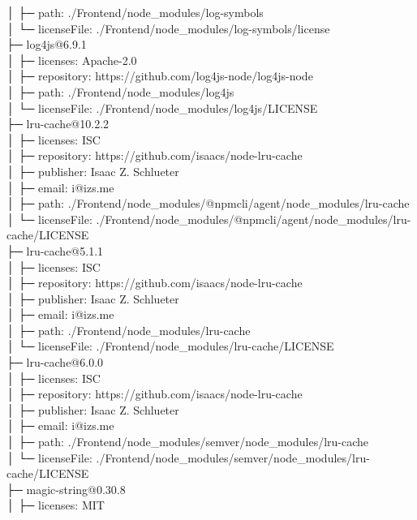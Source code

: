 \documentclass[
    paper=a4,
    twoside=false,
    parskip=half,
    listof=entryprefix,
    listof=totoc,
    index=totoc,
    bibliography=totoc,
    headsepline,
]{scrbook}
\begin{document}
    │  ├─ path: ./Frontend/node\_modules/log-symbols\\
    │  └─ licenseFile: ./Frontend/node\_modules/log-symbols/license\\
    ├─ log4js@6.9.1\\
    │  ├─ licenses: Apache-2.0\\
    │  ├─ repository: https://github.com/log4js-node/log4js-node\\
    │  ├─ path: ./Frontend/node\_modules/log4js\\
    │  └─ licenseFile: ./Frontend/node\_modules/log4js/LICENSE\\
    ├─ lru-cache@10.2.2\\
    │  ├─ licenses: ISC\\
    │  ├─ repository: https://github.com/isaacs/node-lru-cache\\
    │  ├─ publisher: Isaac Z. Schlueter\\
    │  ├─ email: i@izs.me\\
    │  ├─ path: ./Frontend/node\_modules/@npmcli/agent/node\_modules/lru-cache\\
    │  └─ licenseFile: ./Frontend/node\_modules/@npmcli/agent/node\_modules/lru-cache/LICENSE\\
    ├─ lru-cache@5.1.1\\
    │  ├─ licenses: ISC\\
    │  ├─ repository: https://github.com/isaacs/node-lru-cache\\
    │  ├─ publisher: Isaac Z. Schlueter\\
    │  ├─ email: i@izs.me\\
    │  ├─ path: ./Frontend/node\_modules/lru-cache\\
    │  └─ licenseFile: ./Frontend/node\_modules/lru-cache/LICENSE\\
    ├─ lru-cache@6.0.0\\
    │  ├─ licenses: ISC\\
    │  ├─ repository: https://github.com/isaacs/node-lru-cache\\
    │  ├─ publisher: Isaac Z. Schlueter\\
    │  ├─ email: i@izs.me\\
    │  ├─ path: ./Frontend/node\_modules/semver/node\_modules/lru-cache\\
    │  └─ licenseFile: ./Frontend/node\_modules/semver/node\_modules/lru-cache/LICENSE\\
    ├─ magic-string@0.30.8\\
    │  ├─ licenses: MIT\\
\end{document}

